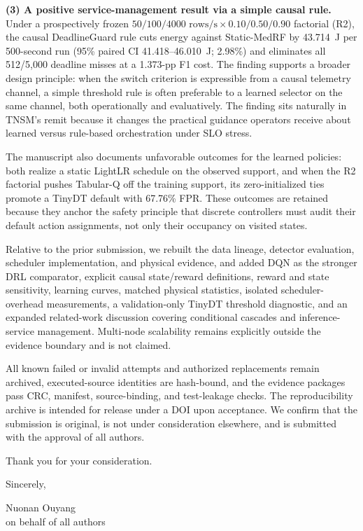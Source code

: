 \documentclass[11pt]{article}
\begin{document}
\textbf{(3) A positive service-management result via a simple causal rule.} Under a prospectively frozen $50/100/4000\text{ rows/s}\times 0.10/0.50/0.90$ factorial (R2), the causal DeadlineGuard rule cuts energy against Static-MedRF by 43.714~J per 500-second run (95\% paired CI 41.418--46.010~J; 2.98\%) and eliminates all 512/5,000 deadline misses at a 1.373-pp F1 cost. The finding supports a broader design principle: when the switch criterion is expressible from a causal telemetry channel, a simple threshold rule is often preferable to a learned selector on the same channel, both operationally and evaluatively. The finding sits naturally in TNSM's remit because it changes the practical guidance operators receive about learned versus rule-based orchestration under SLO stress.

The manuscript also documents unfavorable outcomes for the learned policies: both realize a static LightLR schedule on the observed support, and when the R2 factorial pushes Tabular-Q off the training support, its zero-initialized ties promote a TinyDT default with 67.76\% FPR. These outcomes are retained because they anchor the safety principle that discrete controllers must audit their default action assignments, not only their occupancy on visited states.

Relative to the prior submission, we rebuilt the data lineage, detector evaluation, scheduler implementation, and physical evidence, and added DQN as the stronger DRL comparator, explicit causal state/reward definitions, reward and state sensitivity, learning curves, matched physical statistics, isolated scheduler-overhead measurements, a validation-only TinyDT threshold diagnostic, and an expanded related-work discussion covering conditional cascades and inference-service management. Multi-node scalability remains explicitly outside the evidence boundary and is not claimed.

All known failed or invalid attempts and authorized replacements remain archived, executed-source identities are hash-bound, and the evidence packages pass CRC, manifest, source-binding, and test-leakage checks. The reproducibility archive is intended for release under a DOI upon acceptance. We confirm that the submission is original, is not under consideration elsewhere, and is submitted with the approval of all authors.

Thank you for your consideration.

\vspace{18pt}
Sincerely,

\vspace{34pt}
Nuonan Ouyang\\
on behalf of all authors
\end{document}
